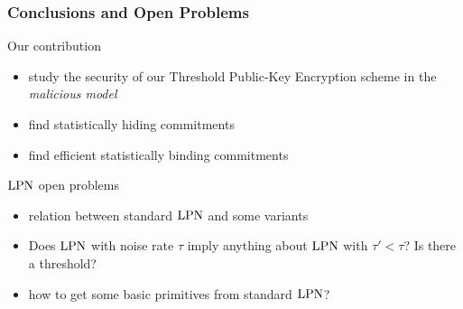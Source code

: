  
\begin{frame}
 \frametitle{Conclusions and Open Problems}
 
 \begin{block}{Our contribution}
\begin{itemize}
 \item study the security of our Threshold Public-Key Encryption scheme in the \emph{malicious model}
 \item find statistically hiding commitments
 \item find efficient statistically binding commitments
\end{itemize}
  
 \end{block}

 \begin{block}{$\mathrm{LPN}$ open problems}
  \begin{itemize}
   \item relation between standard $\mathrm{LPN}$ and some variants
   \item Does $\mathrm{LPN}$ with noise rate $\tau$ imply anything about $\mathrm{LPN}$ with $\tau' < \tau$? Is there a threshold?
   \item how to get some basic primitives from standard $\mathrm{LPN}$?
  \end{itemize}

 \end{block}
 

\end{frame}
